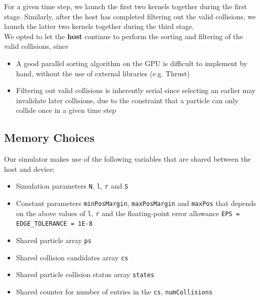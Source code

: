 \documentclass[12pt]{article}
\begin{document}
For a given time step, we launch the first two kernels together during the first stage. Similarly, after the host has completed filtering out the valid collisions, we launch the latter two kernels together during the third stage.\\

We opted to let the \textbf{host} continue to perform the sorting and filtering of the valid collisions, since
\begin{itemize}
    \item A good parallel sorting algorithm on the GPU is difficult to implement by hand, without the use of external libraries (e.g. Thrust)
    \item Filtering out valid collisions is inherently serial since selecting an earlier may invalidate later collisions, due to the constraint that a particle can only collide once in a given time step
\end{itemize}

\subsection{Memory Choices}

Our simulator makes use of the following variables that are shared between the host and device:
\begin{itemize}
    \item Simulation parameters \texttt{N}, \texttt{l}, \texttt{r} and \texttt{S}
    \item Constant parameters \texttt{minPosMargin}, \texttt{maxPosMargin} and \texttt{maxPos} that depends on the above values of \texttt{l}, \texttt{r} and the floating-point error allowance \texttt{EPS = EDGE\_TOLERANCE = 1E-8}
    \item Shared particle array \texttt{ps}
    \item Shared collision candidates array \texttt{cs}
    \item Shared particle collision status array \texttt{states}
    \item Shared counter for number of entries in the \texttt{cs}, \texttt{numCollisions}
\end{itemize}
\end{document}
